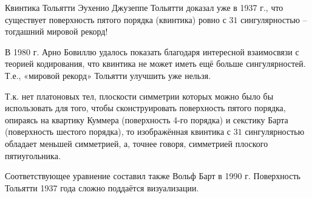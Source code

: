 \begin{surferPage}[Тольятти]{Квинтика Тольятти}
Эухенио Джузеппе Тольятти доказал уже в 1937 г., что существует поверхность пятого порядка (квинтика) ровно с $31$ сингулярностью – тогдашний мировой рекорд!


В 1980 г. Арно Бовиллю удалось показать благодаря интересной взаимосвязи с теорией кодирования, что квинтика не может иметь ещё больше сингулярностей. Т.е., «мировой рекорд» Тольятти улучшить уже нельзя.

Т.к. нет платоновых тел, плоскости симметрии которых можно было бы использовать для того, чтобы сконструировать поверхность пятого порядка, опираясь на квартику Куммера (поверхность 4-го порядка) и секстику Барта (поверхность шестого порядка), то изображённая квинтика с $31$ сингулярностью обладает меньшей симметрией, а, точнее говоря, симметрией плоского пятиугольника.

Соответствующее уравнение составил также Вольф Барт в 1990 г. Поверхность Тольятти 1937 года сложно поддаётся визуализации.
\end{surferPage}
